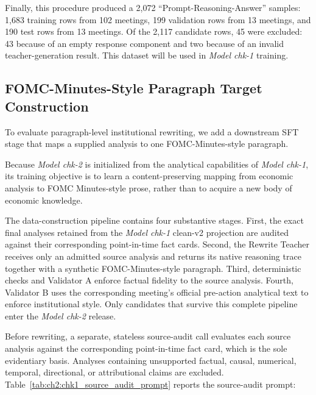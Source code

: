 Finally, this procedure produced a 2,072 ``Prompt-Reasoning-Answer'' samples: 1,683 training rows from 102 meetings, 199 validation rows from 13 meetings, and 190 test rows from 13 meetings. Of the 2,117 candidate rows, 45 were excluded: 43 because of an empty response component and two because of an invalid teacher-generation result. This dataset will be used in \textit{Model chk-1} training. 




\subsection*{FOMC-Minutes-Style Paragraph Target Construction}


To evaluate paragraph-level institutional rewriting, we add a downstream SFT stage that maps a supplied analysis to one FOMC-Minutes-style paragraph.

Because \textit{Model chk-2} is initialized from the analytical capabilities of
\textit{Model chk-1}, its training objective is to learn a content-preserving
mapping from economic analysis to FOMC Minutes-style prose, rather than to
acquire a new body of economic knowledge.

The data-construction pipeline contains four substantive stages. First, the
exact final analyses retained from the \textit{Model chk-1} clean-v2 projection
are audited against their corresponding point-in-time fact cards. Second, the
Rewrite Teacher receives only an admitted source analysis and returns its
native reasoning trace together with a synthetic FOMC-Minutes-style paragraph.
Third, deterministic checks and Validator A enforce factual fidelity to the
source analysis. Fourth, Validator B uses the corresponding meeting's official
pre-action analytical text to enforce institutional style. Only candidates that
survive this complete pipeline enter the \textit{Model chk-2} release.

Before rewriting, a separate, stateless source-audit call evaluates each source
analysis against the corresponding point-in-time fact card, which is the sole
evidentiary basis. Analyses containing unsupported factual, causal, numerical,
temporal, directional, or attributional claims are excluded.
Table~\ref{tab:ch2:chk1_source_audit_prompt} reports the source-audit prompt:

